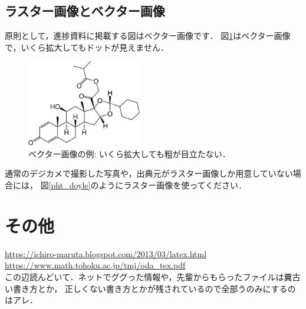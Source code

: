 \documentclass[a4j, dvipdfmx]{jsarticle}
\begin{document}
  \subsection{ラスター画像とベクター画像}
    原則として，進捗資料に掲載する図はベクター画像です．
    図\ref{fig_ciclesonide}はベクター画像で，いくら拡大してもドットが見えません．
      \begin{figure}[tbp]
        \centering
        \includegraphics[width = 5cm]{figure/chemi_vec.pdf}
        \caption{ベクター画像の例: いくら拡大しても粗が目立たない．} \label{fig_ciclesonide}
      \end{figure}
    通常のデジカメで撮影した写真や，出典元がラスター画像しか用意していない場合には，
    図\ref{pht_doyle}のようにラスター画像を使ってください．


\section{その他}
  \url{https://ichiro-maruta.blogspot.com/2013/03/latex.html} \\
  \url{https://www.math.tohoku.ac.jp/tmj/oda_tex.pdf}\\
  この辺読んどいて．ネットでググった情報や，先輩からもらったファイルは糞古い書き方とか，
  正しくない書き方とかが残されているので全部うのみにするのはアレ．
\end{document}
